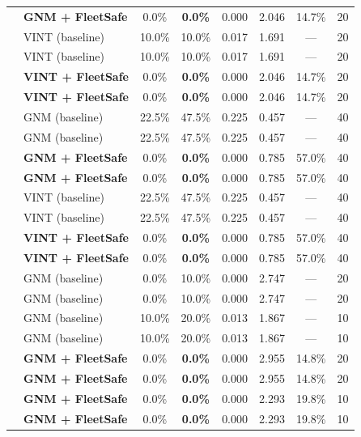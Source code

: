 \begin{table}[t]
{\begin{tabular}{llcccccc}
 & \textbf{GNM + FleetSafe} & 0.0\% & \textbf{\textcolor{ProvenGreen}{0.0\%}} & 0.000 & 2.046 & 14.7\% & 20 \\
 & VINT (baseline) & 10.0\% & 10.0\% & 0.017 & 1.691 & — & 20 \\
 & VINT (baseline) & 10.0\% & 10.0\% & 0.017 & 1.691 & — & 20 \\
 & \textbf{VINT + FleetSafe} & 0.0\% & \textbf{\textcolor{ProvenGreen}{0.0\%}} & 0.000 & 2.046 & 14.7\% & 20 \\
 & \textbf{VINT + FleetSafe} & 0.0\% & \textbf{\textcolor{ProvenGreen}{0.0\%}} & 0.000 & 2.046 & 14.7\% & 20 \\
\midrule
 & GNM (baseline) & 22.5\% & 47.5\% & 0.225 & 0.457 & — & 40 \\
 & GNM (baseline) & 22.5\% & 47.5\% & 0.225 & 0.457 & — & 40 \\
 & \textbf{GNM + FleetSafe} & 0.0\% & \textbf{\textcolor{ProvenGreen}{0.0\%}} & 0.000 & 0.785 & 57.0\% & 40 \\
 & \textbf{GNM + FleetSafe} & 0.0\% & \textbf{\textcolor{ProvenGreen}{0.0\%}} & 0.000 & 0.785 & 57.0\% & 40 \\
 & VINT (baseline) & 22.5\% & 47.5\% & 0.225 & 0.457 & — & 40 \\
 & VINT (baseline) & 22.5\% & 47.5\% & 0.225 & 0.457 & — & 40 \\
 & \textbf{VINT + FleetSafe} & 0.0\% & \textbf{\textcolor{ProvenGreen}{0.0\%}} & 0.000 & 0.785 & 57.0\% & 40 \\
 & \textbf{VINT + FleetSafe} & 0.0\% & \textbf{\textcolor{ProvenGreen}{0.0\%}} & 0.000 & 0.785 & 57.0\% & 40 \\
\midrule
 & GNM (baseline) & 0.0\% & 10.0\% & 0.000 & 2.747 & — & 20 \\
 & GNM (baseline) & 0.0\% & 10.0\% & 0.000 & 2.747 & — & 20 \\
 & GNM (baseline) & 10.0\% & 20.0\% & 0.013 & 1.867 & — & 10 \\
 & GNM (baseline) & 10.0\% & 20.0\% & 0.013 & 1.867 & — & 10 \\
 & \textbf{GNM + FleetSafe} & 0.0\% & \textbf{\textcolor{ProvenGreen}{0.0\%}} & 0.000 & 2.955 & 14.8\% & 20 \\
 & \textbf{GNM + FleetSafe} & 0.0\% & \textbf{\textcolor{ProvenGreen}{0.0\%}} & 0.000 & 2.955 & 14.8\% & 20 \\
 & \textbf{GNM + FleetSafe} & 0.0\% & \textbf{\textcolor{ProvenGreen}{0.0\%}} & 0.000 & 2.293 & 19.8\% & 10 \\
 & \textbf{GNM + FleetSafe} & 0.0\% & \textbf{\textcolor{ProvenGreen}{0.0\%}} & 0.000 & 2.293 & 19.8\% & 10 \\

\end{tabular}}
\end{table}
